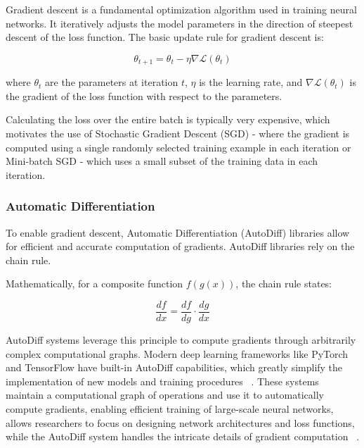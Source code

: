 \documentclass[a4paper, oneside]{discothesis}
\begin{document}
Gradient descent is a fundamental optimization algorithm used in training neural networks. It iteratively adjusts the model parameters in the direction of steepest descent of the loss function. The basic update rule for gradient descent is:

\begin{equation}
    \theta_{t+1} = \theta_t - \eta \nabla \mathcal{L}(\theta_t)
\end{equation}

where $\theta_t$ are the parameters at iteration $t$, $\eta$ is the learning rate, and $\nabla \mathcal{L}(\theta_t)$ is the gradient of the loss function with respect to the parameters.

Calculating the loss over the entire batch is typically very expensive, which motivates the use of Stochastic Gradient Descent (SGD) -  where the gradient is computed using a single randomly selected training example in each iteration or Mini-batch SGD - which uses a small subset of the training data in each iteration.

\subsubsection{Automatic Differentiation}

To enable gradient descent, Automatic Differentiation (AutoDiff) libraries allow for efficient and accurate computation of gradients. AutoDiff libraries rely on the chain rule. 

Mathematically, for a composite function $f(g(x))$, the chain rule states:

\begin{equation}
    \frac{df}{dx} = \frac{df}{dg} \cdot \frac{dg}{dx}
\end{equation}

AutoDiff systems leverage this principle to compute gradients through arbitrarily complex computational graphs. Modern deep learning frameworks like PyTorch and TensorFlow have built-in AutoDiff capabilities, which greatly simplify the implementation of new models and training procedures ~\cite{paszke2019pytorch, abadi2016tensorflow}. These systems maintain a computational graph of operations and use it to automatically compute gradients, enabling efficient training of large-scale neural networks, allows researchers to focus on designing network architectures and loss functions, while the AutoDiff system handles the intricate details of gradient computation ~\cite{baydin2018automatic}.
\end{document}
